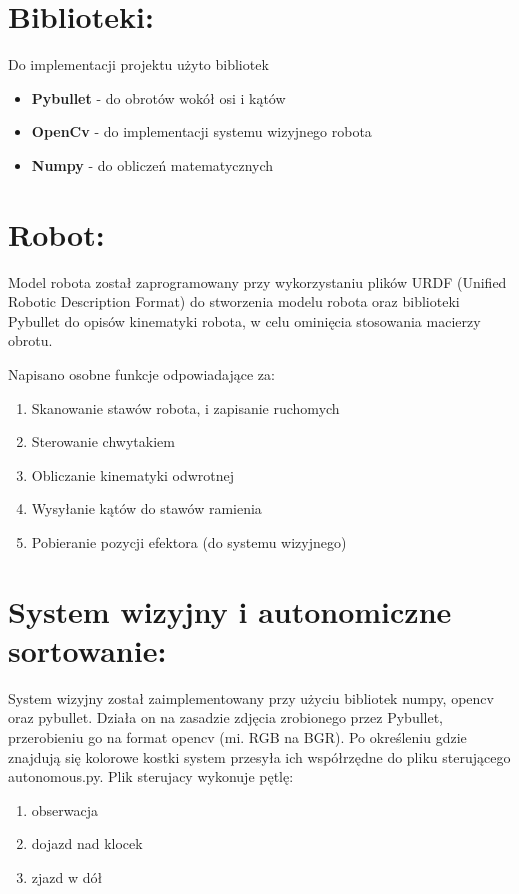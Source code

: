 \documentclass[12pt, a4paper]{article}
\begin{document}
\section{Biblioteki:}
Do implementacji projektu użyto bibliotek
\begin{itemize}[noitemsep, topsep=0pt]
    \item \textbf{Pybullet} - do obrotów wokół osi i kątów
    \item \textbf{OpenCv} - do implementacji systemu wizyjnego robota
    \item \textbf{Numpy} - do obliczeń matematycznych
\end{itemize}

\section{Robot:}
Model robota został zaprogramowany przy wykorzystaniu plików URDF (Unified Robotic Description Format) do stworzenia modelu robota oraz biblioteki Pybullet do opisów kinematyki robota, w celu ominięcia stosowania macierzy obrotu.

Napisano osobne funkcje odpowiadające za:
\begin{enumerate}[label=\alph*., noitemsep, topsep=0pt]
    \item Skanowanie stawów robota, i zapisanie ruchomych
    \item Sterowanie chwytakiem
    \item Obliczanie kinematyki odwrotnej
    \item Wysyłanie kątów do stawów ramienia
    \item Pobieranie pozycji efektora (do systemu wizyjnego)
\end{enumerate}



\section{System wizyjny i autonomiczne sortowanie:}
System wizyjny został zaimplementowany przy użyciu bibliotek numpy, opencv oraz pybullet. Działa on na zasadzie zdjęcia zrobionego przez Pybullet, przerobieniu go na format opencv (mi. RGB na BGR). Po określeniu gdzie znajdują się kolorowe kostki system przesyła ich współrzędne do pliku sterującego autonomous.py. Plik sterujacy wykonuje pętlę:
\begin{enumerate}[label=\alph*., noitemsep, topsep=0pt]
    \item obserwacja
    \item dojazd nad klocek
    \item zjazd w dół
\end{enumerate}
\end{document}
